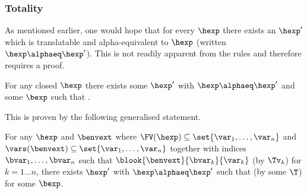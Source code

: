 \subsubsection{Totality}

As mentioned earlier, one would hope that for every $\hexp$ there exists an $\hexp'$ which is translatable and alpha-equivalent to $\hexp$ (written $\hexp \alphaeq \hexp'$).
This is not readily apparent from the rules and therefore requires a proof.

\begin{theorem}[Totality]
\label{thm:totality}
For any closed $\hexp$ there exists some $\hexp'$ with $\hexp \alphaeq \hexp'$ and some $\bexp$ such that .
\end{theorem}

This is proven by the following generalised statement.

\begin{lemma}
For any $\hexp$ and $\benvext$ where $\FV(\hexp) \subseteq \set{\var_1, \ldots, \var_n}$ and $\vars(\benvext) \subseteq \set{\var_1, \ldots, \var_n}$ together with indices $\bvar_1, \ldots, \bvar_n$ such that $\blook{\benvext}{\bvar_k}{\var_k}$ (by $\Tv_k$) for $k = 1 \ldots n$, there exists $\hexp'$ with $\hexp \alphaeq \hexp'$ such that  (by some $\T$) for some $\bexp$.
\end{lemma}

